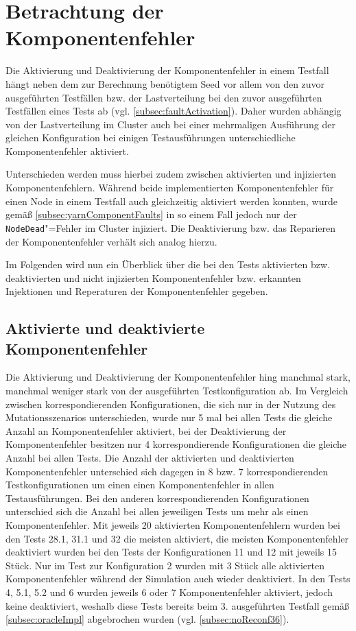 \section{Betrachtung der Komponentenfehler}
\label{sec:faultEval}

Die Aktivierung und Deaktivierung der Komponentenfehler in einem Testfall hängt neben dem zur Berechnung benötigtem Seed vor allem von den zuvor ausgeführten Testfällen bzw. der Lastverteilung bei den zuvor ausgeführten Testfällen eines Tests ab (vgl. \cref{subsec:faultActivation}).
Daher wurden abhängig von der Lastverteilung im Cluster auch bei einer mehrmaligen Ausführung der gleichen Konfiguration bei einigen Testausführungen unterschiedliche Komponentenfehler aktiviert.

Unterschieden werden muss hierbei zudem zwischen aktivierten und injizierten Komponentenfehlern.
Während beide implementierten Komponentenfehler für einen Node in einem Testfall auch gleichzeitig aktiviert werden konnten, wurde gemäß \cref{subsec:yarnComponentFaults} in so einem Fall jedoch nur der \texttt{NodeDead}"=Fehler im Cluster injiziert.
Die Deaktivierung bzw. das Reparieren der Komponentenfehler verhält sich analog hierzu.

Im Folgenden wird nun ein Überblick über die bei den Tests aktivierten bzw. deaktivierten und nicht injizierten Komponentenfehler bzw. erkannten Injektionen und Reperaturen der Komponentenfehler gegeben.

\subsection{Aktivierte und deaktivierte Komponentenfehler}
\label{subsec:actDeactFaults}

Die Aktivierung und Deaktivierung der Komponentenfehler hing manchmal stark, manchmal weniger stark von der ausgeführten Testkonfiguration ab.
Im Vergleich zwischen korrespondierenden Konfigurationen, die sich nur in der Nutzung des Mutationsszenarios unterschieden, wurde nur 5 mal bei allen Tests die gleiche Anzahl an Komponentenfehler aktiviert, bei der Deaktivierung der Komponentenfehler besitzen nur 4 korrespondierende Konfigurationen die gleiche Anzahl bei allen Tests.
Die Anzahl der aktivierten und deaktivierten Komponentenfehler unterschied sich dagegen in 8 bzw. 7 korrespondierenden Testkonfigurationen um einen einen Komponentenfehler in allen Testausführungen.
Bei den anderen korrespondierenden Konfigurationen unterschied sich die Anzahl bei allen jeweiligen Tests um mehr als einen Komponentenfehler.
Mit jeweils 20 aktivierten Komponentenfehlern wurden bei den Tests 28.1, 31.1 und 32 die meisten aktiviert, die meisten Komponentenfehler deaktiviert wurden bei den Tests der Konfigurationen 11 und 12 mit jeweils 15 Stück.
Nur im Test zur Konfiguration 2 wurden mit 3 Stück alle aktivierten Komponentenfehler während der Simulation auch wieder deaktiviert.
In den Tests 4, 5.1, 5.2 und 6 wurden jeweils 6 oder 7 Komponentenfehler aktiviert, jedoch keine deaktiviert, weshalb diese Tests bereits beim 3. ausgeführten Testfall gemäß \cref{subsec:oracleImpl} abgebrochen wurden (vgl. \cref{subsec:noReconf36}).

